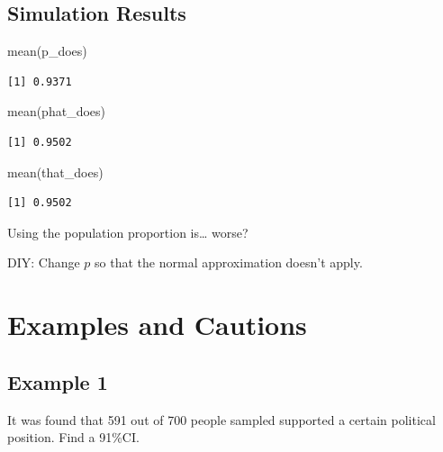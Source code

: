 \documentclass[
  letterpaper,
  DIV=11,
  numbers=noendperiod,
  oneside]{scrreprt}
\newenvironment{Shaded}{\begin{snugshade}}{\end{snugshade}}
\newcommand{\FunctionTok}[1]{\textcolor[rgb]{0.28,0.35,0.67}{#1}}
\newcommand{\NormalTok}[1]{\textcolor[rgb]{0.00,0.23,0.31}{#1}}
\begin{document}
\hypertarget{simulation-results}{%
\subsection{Simulation Results}\label{simulation-results}}

\begin{Shaded}
\begin{Highlighting}[]
\FunctionTok{mean}\NormalTok{(p\_does)}
\end{Highlighting}
\end{Shaded}

\begin{verbatim}
[1] 0.9371
\end{verbatim}

\begin{Shaded}
\begin{Highlighting}[]
\FunctionTok{mean}\NormalTok{(phat\_does)}
\end{Highlighting}
\end{Shaded}

\begin{verbatim}
[1] 0.9502
\end{verbatim}

\begin{Shaded}
\begin{Highlighting}[]
\FunctionTok{mean}\NormalTok{(that\_does)}
\end{Highlighting}
\end{Shaded}

\begin{verbatim}
[1] 0.9502
\end{verbatim}

Using the population proportion is\ldots{} worse?\pause

DIY: Change \(p\) so that the normal approximation doesn't apply.

\hypertarget{examples-and-cautions}{%
\section{Examples and Cautions}\label{examples-and-cautions}}

\hypertarget{example-1-1}{%
\subsection{Example 1}\label{example-1-1}}

It was found that 591 out of 700 people sampled supported a certain
political position. Find a 91\%CI.
\end{document}
